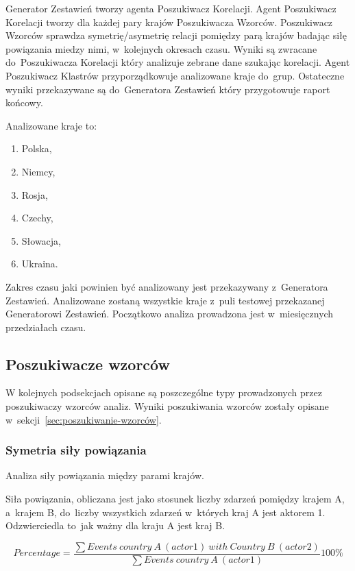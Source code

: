 \documentclass[11pt]{report}
\begin{document}
    Generator Zestawień tworzy agenta Poszukiwacz Korelacji.
    Agent Poszukiwacz Korelacji tworzy dla każdej pary krajów Poszukiwacza Wzorców.
    Poszukiwacz Wzorców sprawdza symetrię/asymetrię relacji pomiędzy parą krajów badając siłę powiązania miedzy nimi, w~kolejnych okresach czasu.
    Wyniki są zwracane do~Poszukiwacza Korelacji który analizuje zebrane dane szukając korelacji.
    Agent Poszukiwacz Klastrów przyporządkowuje analizowane kraje do~grup.
    Ostateczne wyniki przekazywane są do~Generatora Zestawień który przygotowuje raport końcowy.

    Analizowane kraje to:
    \begin{enumerate}
        \item Polska,
        \item Niemcy,
        \item Rosja,
        \item Czechy,
        \item Słowacja,
        \item Ukraina.
    \end{enumerate}

    Zakres czasu jaki powinien być analizowany jest przekazywany z~Generatora Zestawień.
    Analizowane zostaną wszystkie kraje z~puli testowej przekazanej Generatorowi Zestawień.
    Początkowo analiza prowadzona jest w~miesięcznych przedziałach czasu.

    \subsection{Poszukiwacze wzorców}
    W kolejnych podsekcjach opisane są poszczególne typy prowadzonych przez poszukiwaczy wzorców analiz.
    Wyniki poszukiwania wzorców zostały opisane w~sekcji~\ref{sec:poszukiwanie-wzorców}.

    \subsubsection{Symetria siły powiązania}
    Analiza siły powiązania między parami krajów.

    Siła powiązania, obliczana jest jako stosunek liczby zdarzeń pomiędzy krajem A, a~krajem B, do~liczby wszystkich zdarzeń w~których kraj A jest aktorem 1.
    Odzwierciedla to~jak ważny dla kraju A jest kraj B\@.


    \[ Percentage = \frac
    {\sum{Events\ country\ A\ (actor 1)\ with\ Country\ B\ (actor 2)}}
    {\sum{Events\ country\ A\ (actor 1)}}
    100 \%
    \]
\end{document}
